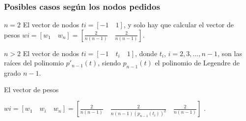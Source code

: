 \documentclass{beamer}
\begin{document}
\begin{frame}
\frametitle{Posibles casos según los nodos pedidos}

\begin{block}{$n=2$}
El vector de nodos $ti=[-1\quad 1]$, y solo hay que calcular el vector de pesos $wi=[w_1\quad w_n]=\left[\tfrac{2}{n(n-1)}\quad \tfrac{2}{n(n-1)}\right]$.
\end{block}

\begin{block}{$n>2$} 
El vector de nodos $ti=[-1\quad t_i \quad 1]$, donde $t_i$, $i=2, 3,...,n-1$, son las raíces del polinomio $p'_{n-1}(t)$, siendo $p_{n-1}(t)$ el polinomio de Legendre de grado $n-1$.

El vector de pesos 

$wi=[w_1 \quad w_i \quad w_n]= \left[\tfrac{2}{n(n-1)} \quad \frac{2}{n(n-1)(p_{n-1}(t_i))^2} \quad \tfrac{2}{n(n-1)}\right]$
.
\end{block}
\end{frame}

\end{document}
